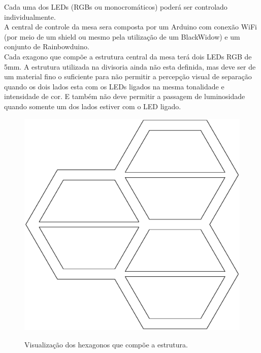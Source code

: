 \documentclass[a4paper,10pt]{article}
\begin{document}
Cada uma dos LEDs (RGBs ou monocromáticos) poderá ser controlado individualmente. \\


A central de controle da mesa sera composta por um Arduino com conexão WiFi (por meio de um shield ou mesmo pela utilização de um BlackWidow) e um conjunto de Rainbowduino. \\

Cada exagono que compõe a estrutura central da mesa terá dois LEDs RGB de 5mm. A estrutura utilizada na divisoria ainda não esta definida, mas deve ser de um material fino o suficiente para não permitir a percepção visual de separação quando os dois lados esta com os LEDs ligados na mesma tonalidade e intensidade de cor. E também não deve permitir a passagem de luminosidade quando somente um dos lados estiver com o LED ligado.

\begin{center}
\begin{figure}[h!]
	\center
	\includegraphics[angle=0, scale=0.25]{./img/prototipo-projeto-mesa-v02-b.ps}
	\label{figura_prototipo}
	\caption{Visualização dos hexagonos que compõe a estrutura.}
\end{figure}
\end{center}
\end{document}
